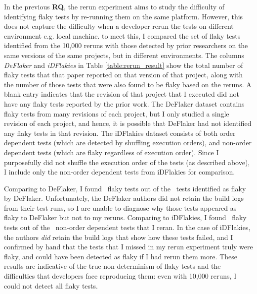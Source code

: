 In the previous \textbf{RQ}, the rerun experiment aims to study the difficulty of identifying flaky tests by re-running them on the same platform. However, this does not capture the difficulty when a developer rerun the tests on different environment e.g. local machine. to meet this, I compared the set of flaky tests identified from the 10,000 reruns with those detected by prior researchers on the same versions of the same projects, but in different environments.
The columns \emph{DeFlaker} and \emph{iDFlakies} in Table \ref{table:rerun_result} show the total number of flaky tests that that paper reported on that version of that project, along with the number of those tests that were also found to be flaky based on the reruns.
A blank entry indicates that the revision of that project that I executed did not have any flaky tests reported by the prior work.
The DeFlaker dataset contains flaky tests from many revisions of each project, but I only studied a single revision of each project, and hence, it is possible that DeFlaker had not identified any flaky tests in that revision.
The iDFlakies dataset consists of both order dependent tests (which are detected by shuffling execution orders), and non-order dependent tests (which are flaky regardless of execution order).
Since I purposefully did not shuffle the execution order of the tests (as described above), I include only the non-order dependent tests from iDFlakies for comparison. 

Comparing to DeFlaker, I found ~flaky tests out of the ~tests identified as flaky by DeFlaker.
Unfortunately, the DeFlaker authors did not retain the build logs from their test runs, so I are unable to diagnose why those tests appeared as flaky to DeFlaker but not to my reruns.
Comparing to iDFlakies, I found \idflakiesCommonFlaky~flaky tests out of the \idflakiesRerunFlaky~non-order dependent tests that I reran.
In the case of iDFlakies, the authors \emph{did} retain the build logs that show how these tests failed, and I confirmed by hand that the tests that I missed in my rerun experiment truly were flaky, and could have been detected as flaky if I had rerun them more.
These results are indicative of the true non-determinism of flaky tests and the difficulties that developers face reproducing them: even with 10,000 reruns, I could not detect all flaky tests.








